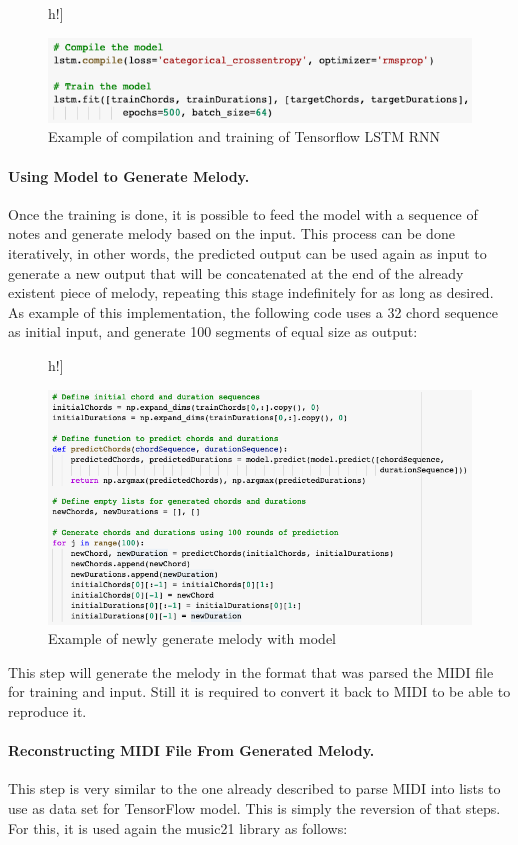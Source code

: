 \begin{figure}[]h!]
  \caption{Example of compilation and training of Tensorflow LSTM RNN }
  \includegraphics[width=\linewidth]{image/fig_JDF23.png}
\end{figure}

\paragraph{Using Model to Generate Melody.}
Once the training is done, it is possible to feed the model with a sequence of notes and
generate melody based on the input. This process can be done iteratively, in other words,
the predicted output can be used again as input to generate a new output that will be
concatenated at the end of the already existent piece of melody, repeating this stage
indefinitely for as long as desired. As example of this implementation, the following code
uses a 32 chord sequence as initial input, and generate 100 segments of equal size as
output:

\begin{figure}[]h!]
  \caption{Example of newly generate melody with model }
  \includegraphics[width=\linewidth]{image/fig_JDF24.png}
\end{figure}

This step will generate the melody in the format that was parsed the MIDI file for
training and input. Still it is required to convert it back to MIDI to be able to
reproduce it.

\paragraph{Reconstructing MIDI File From Generated Melody.} This step is very similar to the one
already described to parse MIDI into lists to use as data set for TensorFlow model. This
is simply the reversion of that steps. For this, it is used again the music21 library as
follows:

